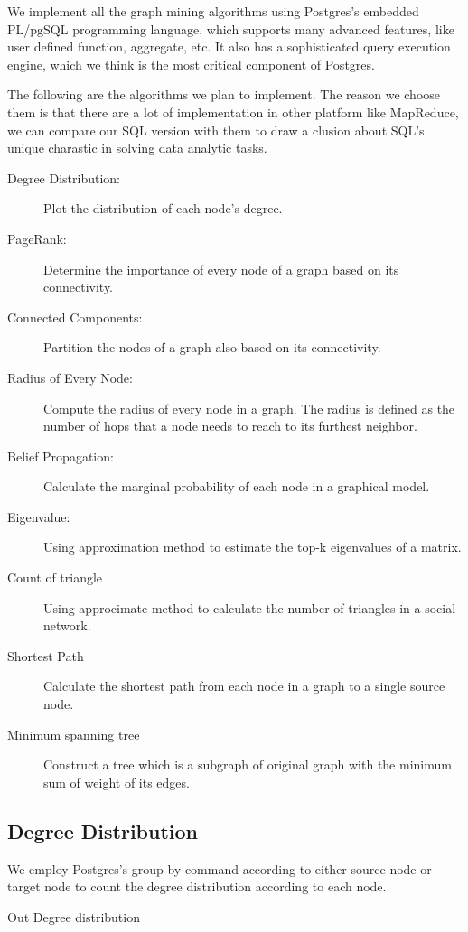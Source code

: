 We implement all the graph mining algorithms using Postgres's embedded PL/pgSQL programming language, which supports many advanced features, like user defined function, aggregate, etc. It also has a sophisticated query execution engine, which we think is the most critical component of Postgres.

The following are the algorithms we plan to implement. The reason we choose them is that there are a lot of implementation in other platform like MapReduce, we can compare our SQL version with them to draw a clusion about SQL's unique charastic in solving data analytic tasks.

\begin{description}
  \item[Degree Distribution:] Plot the distribution of each node's degree. 
  \item[PageRank:] Determine the importance of every node of a graph based on its connectivity. 
  \item[Connected Components:] Partition the nodes of a graph also based on its connectivity.
  \item[Radius of Every Node:] Compute the radius of every node in a graph. The radius is defined as the number of hops that a node needs to reach to its furthest neighbor.
  \item[Belief Propagation:] Calculate the marginal probability of each node in a graphical model. 
  \item[Eigenvalue:] Using approximation method to estimate the top-k eigenvalues of a matrix.
  \item[Count of triangle] Using approcimate method to calculate the number of triangles in a social network.
  \item[Shortest Path] Calculate the shortest path from each node in a graph to a single source node. 
  \item[Minimum spanning tree] Construct a tree which is a subgraph of original graph with the minimum sum of weight of its edges. 
\end{description}

\subsection{Degree Distribution}
We employ Postgres's group by command according to either source node or target node to count the degree distribution according to each node. 

\begin{algorithm}
\caption{Out Degree distribution}
\begin{algorithmic}
\end{algorithmic}
\end{algorithm}

